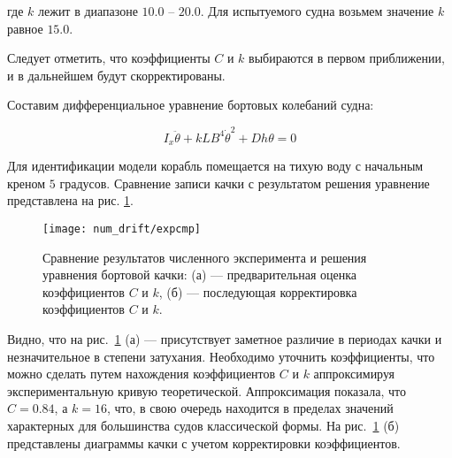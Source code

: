 где $k$ лежит в диапазоне $10.0$ -- $20.0$. Для испытуемого судна возьмем значение $k$ равное $15.0$.

Следует отметить, что коэффициенты $C$ и $k$ выбираются в первом приближении, и в дальнейшем будут скорректированы.

Составим дифференциальное уравнение бортовых колебаний судна:

\begin{equation}
	I_x \ddot{\theta} + kLB^4\dot{\theta}^2 + Dh \theta = 0
	\label{roll_eq}
\end{equation}

Для идентификации модели корабль помещается на тихую воду с начальным креном $5$ градусов. Сравнение записи качки с результатом решения уравнение представлена на рис. \ref{drift:expcmp}.

\begin{figure}
	\texttt{[image: num\_drift/expcmp]}
	\caption{Сравнение результатов численного эксперимента и решения уравнения бортовой качки: (а) --- предварительная оценка коэффициентов $C$ и $k$, (б) --- последующая корректировка коэффициентов $C$ и $k$.}
	\label{drift:expcmp}
\end{figure}

Видно, что на рис.~\ref{drift:expcmp} (а) --- присутствует заметное различие в периодах качки и незначительное в степени затухания. Необходимо уточнить коэффициенты, что можно сделать путем 
нахождения коэффициентов $C$ и $k$ аппроксимируя экспериментальную кривую теоретической.
Аппроксимация показала, что $C=0.84$, а $k=16$, что, в свою очередь находится в пределах значений характерных для большинства судов классической формы. На рис.~\ref{drift:expcmp} (б) представлены 
диаграммы качки с учетом корректировки коэффициентов.

%


